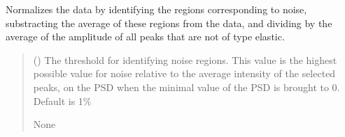 \documentclass[letterpaper,10pt,english]{sphinxmanual}
\begin{document}
\begin{fulllineitems}
\begin{fulllineitems}
\label{\detokenize{source/_autosummary/HDF5_BLS_treat.Treat:HDF5_BLS_treat.Treat.normalize_data}}
\pysigstartsignatures
\pysiglinewithargsret
{}
{}
{}
\pysigstopsignatures
\sphinxAtStartPar
Normalizes the data by identifying the regions corresponding to noise, substracting the average of these regions from the data, and dividing by the average of the amplitude of all peaks that are not of type elastic.
\begin{quote}\begin{description}
\sphinxAtStartPar
{} (\sphinxstyleliteralemphasis{\sphinxupquote{, }}) \textendash{} The threshold for identifying noise regions. This value is the highest possible value for noise relative to the average intensity of the selected peaks, on the PSD when the minimal value of the PSD is brought to 0. Default is 1\%

\sphinxAtStartPar
None

\end{description}\end{quote}

\end{fulllineitems}



\end{fulllineitems}
\end{document}

